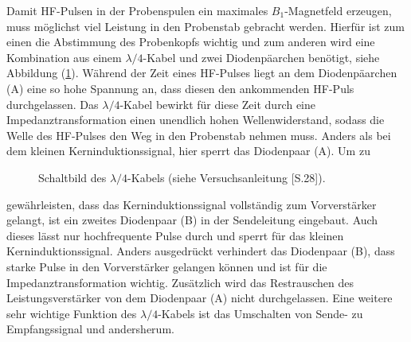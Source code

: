 Damit HF-Pulsen in der Probenspulen ein maximales $B_1$-Magnetfeld erzeugen, muss m\"{o}glichst viel Leistung in den Probenstab gebracht werden.
Hierf\"{u}r ist zum einen die Abstimmung des Probenkopfs wichtig und zum anderen wird eine Kombination aus einem $\lambda / 4$-Kabel und zwei Diodenp\"{a}archen ben\"{o}tigt, siehe Abbildung (\ref{lambda4.}).
W\"{a}hrend der Zeit eines HF-Pulses liegt an dem Diodenp\"{a}archen (A) eine so hohe Spannung an, dass diesen den ankommenden HF-Puls durchgelassen.
Das $\lambda /4$-Kabel bewirkt f\"{u}r diese Zeit durch eine Impedanztransformation einen unendlich hohen Wellenwiderstand, sodass die Welle des HF-Pulses den Weg in den Probenstab nehmen muss.
Anders als bei dem kleinen Kerninduktionssignal, hier sperrt das Diodenpaar (A).
Um zu 
\begin{figure}
	\centering
	\caption{Schaltbild des $\lambda / 4$-Kabels (siehe Versuchsanleitung \cite{Anleitung}[S.28]).}
	\label{lambda4.}
\end{figure}
gew\"{a}hrleisten, dass das Kerninduk{\-}tions{\-}sig{\-}nal vollst\"{a}ndig zum Vorverst\"{a}rker gelangt, ist ein zweites Diodenpaar (B) in der Sendeleitung eingebaut.
Auch dieses l\"{a}sst nur hochfrequente Pulse durch und sperrt f\"{u}r das kleinen Kerninduktionssignal.
Anders ausgedr\"{u}ckt verhindert das Dioden{\-}paar (B), dass starke Pulse in den Vorverst\"{a}rker gelangen k\"{o}nnen und ist f\"{u}r die Impe{\-}danz{\-}trans{\-}formation wichtig.
Zus\"{a}tzlich wird das Restrauschen des Leistungsverst\"{a}rker von dem Diodenpaar (A) nicht durchgelassen.
Eine weitere sehr wichtige Funktion des $\lambda / 4$-Kabels ist das Umschalten von Sende- zu Empfangssignal und andersherum.

